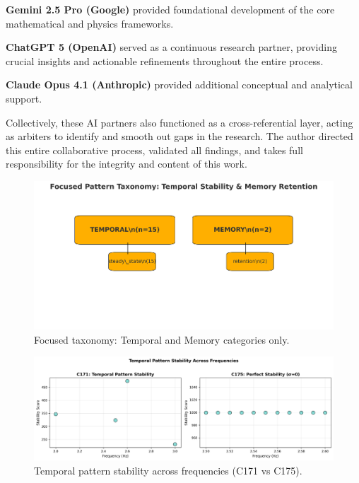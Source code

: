 \documentclass[11pt]{article}
\begin{document}
\textbf{Gemini 2.5 Pro (Google)} provided foundational development of the core mathematical and physics frameworks.

\textbf{ChatGPT 5 (OpenAI)} served as a continuous research partner, providing crucial insights and actionable refinements throughout the entire process.

\textbf{Claude Opus 4.1 (Anthropic)} provided additional conceptual and analytical support.

Collectively, these AI partners also functioned as a cross-referential layer, acting as arbiters to identify and smooth out gaps in the research. The author directed this entire collaborative process, validated all findings, and takes full responsibility for the integrity and content of this work.


\begin{figure}[t]
\centering
\includegraphics[width=0.9\linewidth]{figure1_taxonomy_focused.png}
\caption{Focused taxonomy: Temporal and Memory categories only.}
\end{figure}

\begin{figure}[t]
\centering
\includegraphics[width=0.95\linewidth]{figure2_temporal_pattern_heatmap.png}
\caption{Temporal pattern stability across frequencies (C171 vs C175).}
\end{figure}
\end{document}
